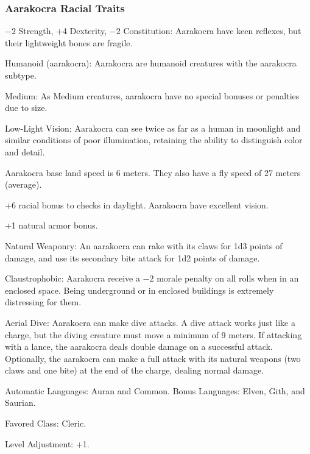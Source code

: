 \subsubsection{Aarakocra Racial Traits}
\begin{itemize*}
    \item $-2$ Strength, +4 Dexterity, $-2$ Constitution: Aarakocra have keen reflexes, but their lightweight bones are fragile.
    \item Humanoid (aarakocra): Aarakocra are humanoid creatures with the aarakocra subtype.
    \item Medium: As Medium creatures, aarakocra have no special bonuses or penalties due to size.
    \item Low-Light Vision: Aarakocra can see twice as far as a human in moonlight and similar conditions of poor illumination, retaining the ability to distinguish color and detail.
    \item Aarakocra base land speed is 6 meters. They also have a fly speed of 27 meters (average).
    \item +6 racial bonus to  checks in daylight. Aarakocra have excellent vision.
    \item +1 natural armor bonus.
    \item Natural Weaponry: An aarakocra can rake with its claws for 1d3 points of damage, and use its secondary bite attack for 1d2 points of damage.
    \item Claustrophobic: Aarakocra receive a $-2$ morale penalty on all rolls when in an enclosed space. Being underground or in enclosed buildings is extremely distressing for them.
    \item Aerial Dive: Aarakocra can make dive attacks. A dive attack works just like a charge, but the diving creature must move a minimum of 9 meters. If attacking with a lance, the aarakocra deals double damage on a successful attack. Optionally, the aarakocra can make a full attack with its natural weapons (two claws and one bite) at the end of the charge, dealing normal damage.
    \item Automatic Languages: Auran and Common. Bonus Languages: Elven, Gith, and Saurian.
    \item Favored Class: Cleric.
    \item Level Adjustment: +1.
\end{itemize*}